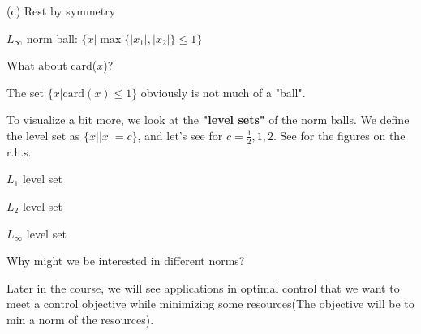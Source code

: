 (c) Rest by symmetry

\newpage
$L_{\infty}$ norm ball: $\{x|\max\{\vert x_{1}\vert, \vert x_{2}\vert\} \leq 1\}$

\begin{figure}
	\centering
	\resizebox{7.5cm}{3cm}{}
	\label{}
\end{figure}

What about card($x$)? 

\begin{figure}
	\centering
	\resizebox{7.5cm}{3cm}{}
	\label{}
\end{figure}

The set $\{x|\text{card}(x)\leq 1\}$ obviously is not much of a "ball".

\vspace{0.5cm}
To visualize a bit more, we look at the \textbf{"level sets"} of the norm balls. We define the level set as $\{x|\vert x\vert=c \}$, and let's see for $c=\frac{1}{2}, 1, 2$. See for the figures on the r.h.s.

\begin{marginfigure}
	\centering
	\resizebox{7.5cm}{3cm}{}
	\caption{$L_{1}$ level set}
	\label{}
\end{marginfigure}

\begin{marginfigure}
	\centering
	\resizebox{7.5cm}{3cm}{}
	\caption{$L_{2}$ level set}
	\label{}
\end{marginfigure}

\begin{marginfigure}
	\centering
	\resizebox{7.5cm}{3cm}{}
	\caption{$L_{\infty}$ level set}
	\label{}
\end{marginfigure}

\vspace{0.3cm}
Why might we be interested in different norms?

Later in the course, we will see applications in optimal control that we want to meet a control objective while minimizing some resources(The objective will be to min a norm of the resources). %




